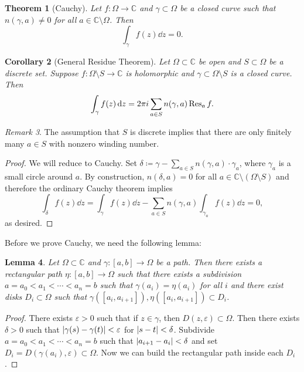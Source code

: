 \documentclass[leqno, openany]{memoir}
\newtheorem{thm}{Theorem}[section]
\newtheorem{cor}[thm]{Corollary}
\newtheorem{lem}[thm]{Lemma}
\theoremstyle{definition}
\theoremstyle{remark}
\newtheorem{rmk}[thm]{Remark}
\theoremstyle{plain}
\theoremstyle{definition}
\theoremstyle{remark}
\newcommand{\C}{\mathbb{C}}
\newcommand{\ep}{\varepsilon}
\begin{document}
\begin{thm}[Cauchy] Let $f \colon \Omega \to \C$ and $\gamma \subset \Omega$ be
    a closed curve such that $n(\gamma, a) \neq 0$ for all $a \in \C \setminus
    \Omega$. Then \[ \int_{\gamma} f(z) \dd{z} = 0. \] \end{thm}

\begin{cor}[General Residue Theorem] Let $\Omega \subset \C$ be open and $S
    \subset \Omega$ be a discrete set. Suppose $f \colon \Omega \setminus S \to
    \C$ is holomorphic and $\gamma \subset \Omega \setminus S$ is a closed
    curve. Then \[ \int_{\gamma} f(z) \dd{z} = 2 \pi i \sum_{a \in S} n(\gamma,
    a) \Res_a f. \] \end{cor}

\begin{rmk} The assumption that $S$ is discrete implies that there are only
finitely many $a \in S$ with nonzero winding number.  \end{rmk}

\begin{proof} We will reduce to Cauchy. Set $\delta \coloneqq \gamma - \sum_{a
    \in S} n(\gamma, a) \cdot \gamma_a$, where $\gamma_a$ is a small circle
    around $a$. By construction, $n(\delta, a) = 0$ for all $a \in \C \setminus
    (\Omega \setminus S)$ and therefore the ordinary Cauchy theorem implies \[
    \int_{\delta} f(z) \dd{z} = \int_{\gamma} f(z) \dd{z} - \sum_{a \in S}
n(\gamma, a) \int_{\gamma_a} f(z) \dd{z} = 0, \] as desired.  \end{proof}

Before we prove Cauchy, we need the following lemma: \begin{lem} Let $\Omega
    \subset \C$ and $\gamma \colon [a,b] \to \Omega$ be a path. Then there
    exists a rectangular path $\eta \colon [a,b] \to \Omega$ such that there
    exists a subdivision $a = a_0 < a_1 < \cdots < a_n = b$ such that
    $\gamma(a_i) = \eta(a_i)$ for all $i$ and there exist disks $D_i \subset
    \Omega$ such that $\gamma([a_i, a_{i+1}]), \eta([a_i, a_{i+1}]) \subset
    D_i$.  \end{lem}

\begin{proof} There exists $\ep > 0$ such that if $z \in \gamma$, then $D(z,
    \ep) \subset \Omega$. Then there exists $\delta > 0$ such that
    $\abs{\gamma(s) - \gamma(t)} < \ep$ for $\abs{s-t} < \delta$. Subdivide $a
    = a_0 < a_1 < \cdots < a_n = b$ such that $\abs{a_{i+1} - a_i} < \delta$
    and set $D_i = D(\gamma(a_i), \ep) \subset \Omega$. Now we can build the
    rectangular path inside each $D_i$.  \end{proof}
\end{document}
